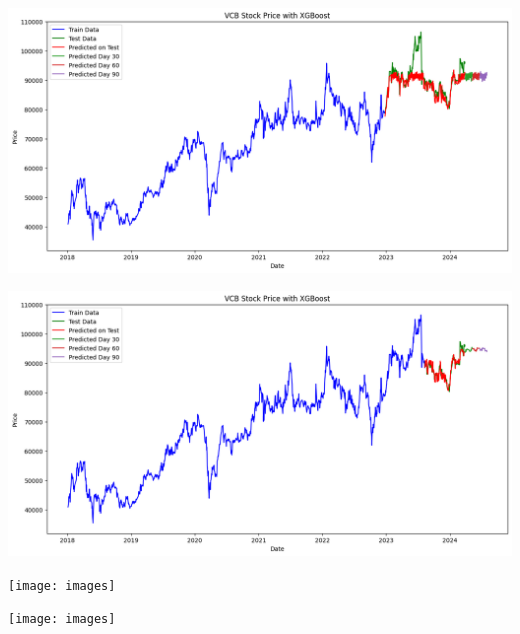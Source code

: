 \documentclass[conference]{IEEEtran}
\begin{document}
\begin{minipage}{0.23\textwidth}
    \centering
    \includegraphics[width=\linewidth]{images/XGBoost/XGBoost_VCB_82.png}
    \label{fig:image1}
\end{minipage}
\hfill
\begin{minipage}{0.23\textwidth}
    \centering
    \includegraphics[width=\linewidth]{images/XGBoost/XGBoost_VCB_91.png}
    \label{fig:image2}
\end{minipage}

\begin{minipage}{0.23\textwidth}
    \centering
    \texttt{[image: images]}
    \label{fig:image1}
\end{minipage}
\hfill
\begin{minipage}{0.23\textwidth}
    \centering
    \texttt{[image: images]}
    \label{fig:image2}
\end{minipage}
\end{document}
